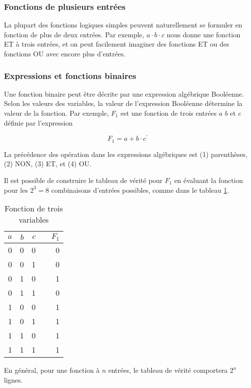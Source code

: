 \documentclass[11pt]{article}
\begin{document}
\subsubsection{Fonctions de plusieurs entrées}
\label{sec:org32001fa}

La plupart des fonctions logiques simples peuvent naturellement se
formuler en fonction de plus de deux entrées. Par exemple, \(a \cdot b
\cdot c\) nous donne une fonction ET à trois entrées, et on peut
facilement imaginer des fonctions ET ou des fonctions OU avec encore
plus d'entrées.

\subsubsection{Expressions et fonctions binaires}
\label{sec:org06788b0}

Une fonction binaire peut être décrite par une expression algébrique
Booléenne. Selon les valeurs des variables, la valeur de l'expression
Booléenne détermine la valeur de la fonction. Par exemple, \(F_1\) est
une fonction de trois entrées \(a\) \(b\) et \(c\) définie par
l'expression

$$ F_1 = a + b \cdot c^\prime $$

La précédence des opération dans les expressions algébriques est (1)
parenthèses, (2) NON, (3) ET, et (4) OU.

Il est possible de construire le tableau de vérité pour \(F_1\) en
évaluant la fonction pour les \(2^3 = 8\) combinaisons d'entrées
possibles, comme dans le tableau \ref{tab:org6154b0a}.

\begin{table}[htbp]
\caption{\label{tab:org6154b0a}Fonction de trois variables}
\centering
\begin{tabular}{rrrlr}
\(a\) & \(b\) & \(c\) &  & \(F_1\)\\
\hline
0 & 0 & 0 &  & 0\\
0 & 0 & 1 &  & 0\\
0 & 1 & 0 &  & 1\\
0 & 1 & 1 &  & 0\\
1 & 0 & 0 &  & 1\\
1 & 0 & 1 &  & 1\\
1 & 1 & 0 &  & 1\\
1 & 1 & 1 &  & 1\\
\end{tabular}
\end{table}

En général, pour une fonction à \(n\) entrées, le tableau de vérité
comportera \(2^n\) lignes.
\end{document}
